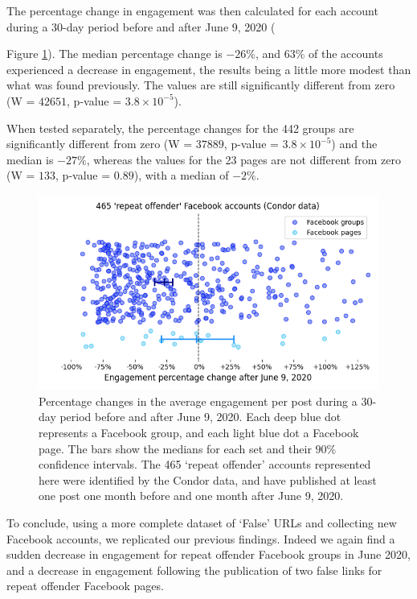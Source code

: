 \documentclass[review]{elsarticle}
\begin{document}
The percentage change in engagement was then calculated for each account during a 30-day period before and after June 9, 2020 ({Figure \ref{condor_june_drop_percentage_change}).
The median percentage change is $-26\%$, and $63\%$ of the accounts experienced a decrease in engagement, the results being a little more modest than what was found previously.
The values are still significantly different from zero (W = $42651$, p-value = $3.8 \times 10^{-5}$).

When tested separately, the percentage changes for the 442 groups are significantly different from zero (W = $37889$, p-value = $3.8 \times 10^{-5}$) and the median is $-27\%$, whereas the values for the 23 pages are not different from zero (W = $133$, p-value = $0.89$), with a median of $-2\%$.

\begin{figure}[!h]
\centering
\includegraphics[scale=0.5]{./../figure/condor_june_drop_percentage_change.png}
\caption{
Percentage changes in the average engagement per post during a 30-day period before and after June 9, 2020. 
Each deep blue dot represents a Facebook group, and each light blue dot a Facebook page.
The bars show the medians for each set and their $90\%$ confidence intervals.
The 465 `repeat offender' accounts represented here were identified by the Condor data, and have published at least one post one month before and one month after June 9, 2020.
}
\label{condor_june_drop_percentage_change}
\end{figure}

To conclude, using a more complete dataset of `False' URLs and collecting new Facebook accounts, we replicated our previous findings. 
Indeed we again find a sudden decrease in engagement for repeat offender Facebook groups in June 2020, and a decrease in engagement following the publication of two false links for repeat offender Facebook pages.

}
\end{document}

